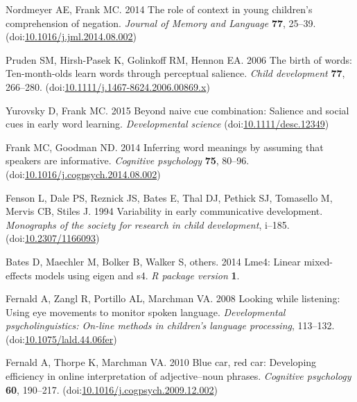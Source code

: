 \documentclass{rsos}
\begin{document}
\begin{thebibliography}{10}
\hypertarget{ref-nordmeyer2014}{}
 Nordmeyer AE, Frank MC. 2014 The role of context in young children's
comprehension of negation. \emph{Journal of Memory and Language}
\textbf{77}, 25--39.
(doi:\href{https://doi.org/10.1016/j.jml.2014.08.002}{10.1016/j.jml.2014.08.002})

\hypertarget{ref-pruden2006}{}
 Pruden SM, Hirsh-Pasek K, Golinkoff RM, Hennon EA. 2006 The birth of
words: Ten-month-olds learn words through perceptual salience.
\emph{Child development} \textbf{77}, 266--280.
(doi:\href{https://doi.org/10.1111/j.1467-8624.2006.00869.x}{10.1111/j.1467-8624.2006.00869.x})

\hypertarget{ref-yurovsky2015}{}
 Yurovsky D, Frank MC. 2015 Beyond naive cue combination: Salience
and social cues in early word learning. \emph{Developmental science}
(doi:\href{https://doi.org/10.1111/desc.12349}{10.1111/desc.12349})

\hypertarget{ref-frank2014}{}
 Frank MC, Goodman ND. 2014 Inferring word meanings by assuming that
speakers are informative. \emph{Cognitive psychology} \textbf{75},
80--96.
(doi:\href{https://doi.org/10.1016/j.cogpsych.2014.08.002}{10.1016/j.cogpsych.2014.08.002})

\hypertarget{ref-fenson1994}{}
 Fenson L, Dale PS, Reznick JS, Bates E, Thal DJ, Pethick SJ,
Tomasello M, Mervis CB, Stiles J. 1994 Variability in early
communicative development. \emph{Monographs of the society for research
in child development}, i--185.
(doi:\href{https://doi.org/10.2307/1166093}{10.2307/1166093})

\hypertarget{ref-bates2014lme4}{}
  Bates D, Maechler M, Bolker B, Walker S, others. 2014 Lme4: Linear
mixed-effects models using eigen and s4. \emph{R package version}
\textbf{1}.

\hypertarget{ref-fernald2008}{}
 Fernald A, Zangl R, Portillo AL, Marchman VA. 2008 Looking while
listening: Using eye movements to monitor spoken language.
\emph{Developmental psycholinguistics: On-line methods in children's
language processing}, 113--132.
(doi:\href{https://doi.org/10.1075/lald.44.06fer}{10.1075/lald.44.06fer})

\hypertarget{ref-fernald2010}{}
 Fernald A, Thorpe K, Marchman VA. 2010 Blue car, red car: Developing
efficiency in online interpretation of adjective--noun phrases.
\emph{Cognitive psychology} \textbf{60}, 190--217.
(doi:\href{https://doi.org/10.1016/j.cogpsych.2009.12.002}{10.1016/j.cogpsych.2009.12.002})


\end{thebibliography}
\end{document}
